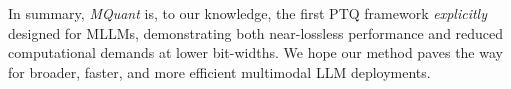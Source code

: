 In summary, \emph{MQuant} is, to our knowledge, the first PTQ framework \emph{explicitly} designed for MLLMs, demonstrating
both near-lossless performance and reduced computational demands at lower bit-widths. We hope our method paves the way
for broader, faster, and more efficient multimodal LLM deployments.